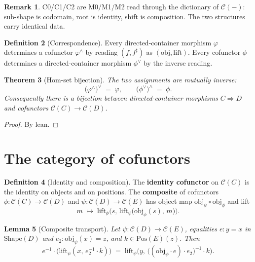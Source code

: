 \documentclass[11pt,a4paper]{article}
\theoremstyle{plain}
\newtheorem{theorem}{Theorem}[section]
\newtheorem{lemma}[theorem]{Lemma}
\theoremstyle{definition}
\newtheorem{definition}[theorem]{Definition}
\newtheorem{remark}[theorem]{Remark}
\newcommand{\Shape}{\mathrm{Shape}}
\newcommand{\Pos}{\mathrm{Pos}}
\newcommand{\cat}{\mathcal{C}}
\begin{document}
\begin{remark}
C0/C1/C2 are M0/M1/M2 read through the dictionary of $\cat(-)$: sub-shape is
codomain, root is identity, shift is composition. The two structures carry
identical data.
\end{remark}

\begin{definition}[Correspondence]\label{def:correspondence}
Every directed-container morphism $\varphi$ determines a cofunctor
$\varphi^\wedge$ by reading $(f,f^\sharp)$ as $(\mathrm{obj},\mathrm{lift})$.
Every cofunctor $\phi$ determines a directed-container morphism $\phi^\vee$ by
the inverse reading.
\end{definition}

\begin{theorem}[Hom-set bijection]\label{thm:hom-bij}
The two assignments are mutually inverse:
\begin{equation}
  \bigl(\varphi^\wedge\bigr)^\vee \;=\; \varphi,
  \qquad
  \bigl(\phi^\vee\bigr)^\wedge \;=\; \phi.
\end{equation}
Consequently there is a bijection between directed-container morphisms
$C\Rightarrow D$ and cofunctors $\cat(C)\to\cat(D)$.
\end{theorem}

\begin{proof}
By lean.
\end{proof}

\section{The category of cofunctors}

\begin{definition}[Identity and composition]\label{def:cof-ops}
The \textbf{identity cofunctor} on $\cat(C)$ is the identity on objects and
on positions. The \textbf{composite} of cofunctors
$\phi:\cat(C)\to\cat(D)$ and $\psi:\cat(D)\to\cat(E)$ has object map
$\mathrm{obj}_\psi\circ\mathrm{obj}_\phi$ and lift
\[
  m \;\mapsto\;
  \mathrm{lift}_\phi\bigl(s,\,
    \mathrm{lift}_\psi\bigl(\mathrm{obj}_\phi(s),\,m\bigr)
  \bigr).
\]
\end{definition}

\begin{lemma}[Composite transport]\label{lem:comp-transport}
Let $\psi:\cat(D)\to\cat(E)$, equalities $e:y=x$ in $\Shape(D)$ and
$e_2:\mathrm{obj}_\psi(x)=z$, and $k\in\Pos(E)(z)$. Then
\begin{equation}
  e^{-1}\cdot\bigl(
    \mathrm{lift}_\psi(x,\,e_2^{-1}\cdot k)
  \bigr)
  \;=\;
  \mathrm{lift}_\psi\bigl(
    y,\,
    \bigl((\mathrm{obj}_\psi\cdot e)\cdot e_2\bigr)^{-1}\cdot k
  \bigr).
\end{equation}
\end{lemma}
\end{document}
